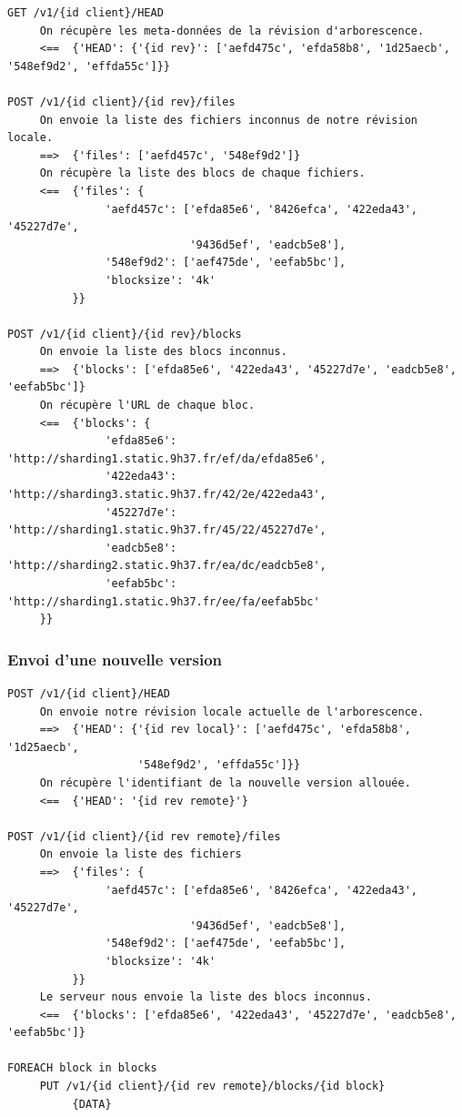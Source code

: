 \begin{verbatim}
GET /v1/{id client}/HEAD
     On récupère les meta-données de la révision d'arborescence.
     <==  {'HEAD': {'{id rev}': ['aefd475c', 'efda58b8', '1d25aecb', '548ef9d2', 'effda55c']}}

POST /v1/{id client}/{id rev}/files
     On envoie la liste des fichiers inconnus de notre révision locale.
     ==>  {'files': ['aefd457c', '548ef9d2']}
     On récupère la liste des blocs de chaque fichiers.
     <==  {'files': {
               'aefd457c': ['efda85e6', '8426efca', '422eda43', '45227d7e',
                            '9436d5ef', 'eadcb5e8'],
               '548ef9d2': ['aef475de', 'eefab5bc'],
               'blocksize': '4k'
          }}

POST /v1/{id client}/{id rev}/blocks
     On envoie la liste des blocs inconnus.
     ==>  {'blocks': ['efda85e6', '422eda43', '45227d7e', 'eadcb5e8', 'eefab5bc']}
     On récupère l'URL de chaque bloc.
     <==  {'blocks': {
               'efda85e6': 'http://sharding1.static.9h37.fr/ef/da/efda85e6',
               '422eda43': 'http://sharding3.static.9h37.fr/42/2e/422eda43',
               '45227d7e': 'http://sharding1.static.9h37.fr/45/22/45227d7e',
               'eadcb5e8': 'http://sharding2.static.9h37.fr/ea/dc/eadcb5e8',
               'eefab5bc': 'http://sharding1.static.9h37.fr/ee/fa/eefab5bc'
     }}
\end{verbatim}

\subsubsection{Envoi d'une nouvelle version}

\begin{verbatim}
POST /v1/{id client}/HEAD
     On envoie notre révision locale actuelle de l'arborescence.
     ==>  {'HEAD': {'{id rev local}': ['aefd475c', 'efda58b8', '1d25aecb',
                    '548ef9d2', 'effda55c']}}
     On récupère l'identifiant de la nouvelle version allouée.
     <==  {'HEAD': '{id rev remote}'}

POST /v1/{id client}/{id rev remote}/files
     On envoie la liste des fichiers
     ==>  {'files': {
               'aefd457c': ['efda85e6', '8426efca', '422eda43', '45227d7e',
                            '9436d5ef', 'eadcb5e8'],
               '548ef9d2': ['aef475de', 'eefab5bc'],
               'blocksize': '4k'
          }}
     Le serveur nous envoie la liste des blocs inconnus.
     <==  {'blocks': ['efda85e6', '422eda43', '45227d7e', 'eadcb5e8', 'eefab5bc']}

FOREACH block in blocks
     PUT /v1/{id client}/{id rev remote}/blocks/{id block}
          {DATA}
\end{verbatim}

